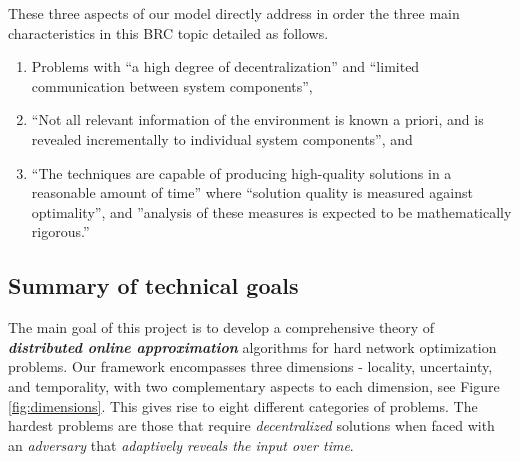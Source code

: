 These three aspects of our model directly address in order the three main
characteristics in this BRC topic detailed as follows.
\begin{enumerate}
\item Problems with ``a high degree of decentralization'' and
  ``limited communication between system components'',
\item ``Not all relevant information of the environment is known a
  priori, and is revealed incrementally to individual system
  components'', and
\item ``The techniques are capable of producing high-quality solutions
  in a reasonable amount of time'' where ``solution quality is
  measured against optimality'', and ''analysis of these measures is
  expected to be mathematically rigorous.''
\end{enumerate}

\subsection{Summary of technical goals}
\label{sec:goals}

The main goal of this project is to develop a comprehensive theory of
{\bf \em distributed online approximation}\/ algorithms for hard
network optimization problems.  Our
framework encompasses three dimensions - locality, uncertainty, and
temporality, with two complementary aspects to each dimension, see
Figure \ref{fig:dimensions}.  This gives rise to eight different
categories of problems.  The hardest problems are those that require
{\em decentralized}\/ solutions when faced with an {\em adversary}\/
that {\em adaptively reveals the input over time}. 

